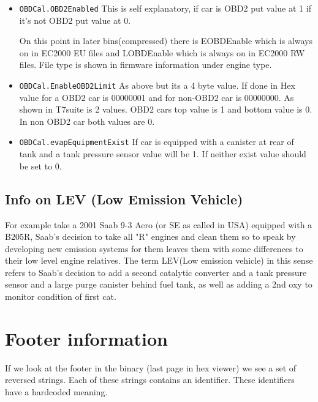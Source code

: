 \documentclass[11pt,a4paper]{book}
\begin{document}
    \begin{itemize}
        \item
            \texttt{OBDCal.OBD2Enabled} This is self explanatory, if car is OBD2 put value at 1 if it's not OBD2 put value
at 0.

On this point in later bins(compressed) there is EOBDEnable which is always on in EC2000 EU files
and LOBDEnable which is always on in EC2000 RW files. File type is shown in firmware information
under engine type.

\item \texttt{OBDCal.EnableOBD2Limit} As above but its a 4 byte value. If done in Hex value for a OBD2 car is
00000001 and for non-OBD2 car is 00000000. As shown in T7suite is 2 values. OBD2 cars top value is
1 and bottom value is 0. In non OBD2 car both values are 0.

\item \texttt{OBDCal.evapEquipmentExist} If car is equipped with a canister at rear of tank and a tank pressure
sensor value will be 1. If neither exist value should be set to 0.
    \end{itemize}

\subsection{Info on LEV (Low Emission Vehicle)}
For example take a 2001 Saab 9-3 Aero (or SE as called in USA) equipped with a
B205R, Saab's decision to take all "R" engines and clean them so to speak by
developing new emission systems for them leaves them with some differences to
their low level engine relatives. The term LEV(Low emission vehicle) in this
sense refers to Saab's decision to add a second catalytic converter and a tank
pressure sensor and a large purge canister behind fuel tank, as well as adding a
2nd oxy to monitor condition of first cat.

\section{Footer information}
If we look at the footer in the binary (last page in hex viewer) we see a set of
reversed strings. Each of these strings contains an identifier. These
identifiers have a hardcoded meaning.
\end{document}
